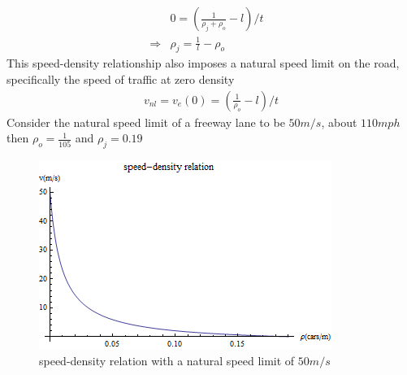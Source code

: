 	\begin{align}
	& 0 =  (\frac{1}{\rho_j+\rho_o}-l)/t & \\
	\Rightarrow & \rho_j=\frac{1}{l}-\rho_o &
	\end{align}
	This speed-density relationship also imposes a natural speed limit on the road, specifically the speed of traffic at zero density
	\begin{align}
	& v_{nl} = v_e(0) =  (\frac{1}{\rho_o}-l)/t &
	\end{align}
	Consider the natural speed limit of a freeway lane to be $50m/s$, about $110mph$ then $\rho_o=\frac{1}{105}$ and $\rho_j=0.19$
	\begin{figure}[h]
	\includegraphics[scale=.6]{plot/speed_density}
	\caption{speed-density relation with a natural speed limit of $50m/s$}
	\end{figure}
	
